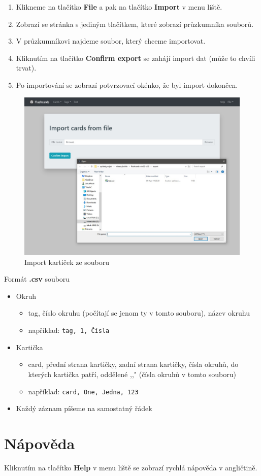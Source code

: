 \documentclass[11pt]{article}
\providecommand{\tightlist}{\setlength{\itemsep}{1pt}\setlength{\parskip}{1pt}}
\let\oldtexttt\texttt
\renewcommand{\texttt}[1]{\oldtexttt{\textcolor{codehighlight}{#1}}}
\begin{document}
\begin{enumerate}
\def\labelenumi{\arabic{enumi}.}
\tightlist
\item
  Klikneme na tlačítko \textbf{File} a pak na tlačítko \textbf{Import} v
  menu liště.
\item
  Zobrazí se stránka s jediným tlačítkem, které zobrazí průzkumníka
  souborů.
\item
  V průzkumníkovi najdeme soubor, který chceme importovat.
\item
  Kliknutím na tlačítko \textbf{Confirm export} se zahájí import dat
  (může to chvíli trvat).
\item
  Po importování se zobrazí potvrzovací okénko, že byl import dokončen.
\end{enumerate}

\begin{figure}
\centering
\includegraphics{assets/import.jpg}
\caption{Import kartiček ze souboru}
\end{figure}

Formát \textbf{.csv} souboru

\begin{itemize}
\tightlist
\item
  Okruh

  \begin{itemize}
  \tightlist
  \item
    tag, číslo okruhu (počítají se jenom ty v tomto souboru), název
    okruhu
  \item
    například: \texttt{tag,\ 1,\ Čísla}
  \end{itemize}
\item
  Kartička

  \begin{itemize}
  \tightlist
  \item
    card, přední strana kartičky, zadní strana kartičky, čísla okruhů,
    do kterých kartička patří, oddělené ,,\textbar{}" (čísla okruhů v
    tomto souboru)
  \item
    například: \texttt{card,\ One,\ Jedna,\ 1\textbar{}2\textbar{}3}
  \end{itemize}
\item
  Každý záznam píšeme na samostatný řádek
\end{itemize}

\hypertarget{nuxe1povux11bda}{%
\section{Nápověda}\label{nuxe1povux11bda}}

Kliknutím na tlačítko \textbf{Help} v menu liště se zobrazí rychlá
nápověda v angličtině.
\clearpage

\end{document}
